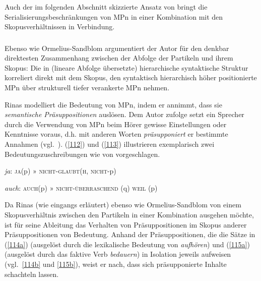 \noindent
Auch der im folgenden Abschnitt skizzierte Ansatz von \citet{Rinas2006, Rinas2007} bringt die Seria\-lisierungsbeschränkungen von MPn in einer Kombination mit den Skopusverhältnissen in Verbindung.

\subsubsection{\citet{Rinas2007}}
\label{sec:ri}
Ebenso wie Ormelius-Sandblom argumentiert der Autor für den denkbar direktesten Zusammenhang zwischen der Abfolge der Partikeln und ihrem Skopus: Die in (lineare Abfolge übersetzte) hierarchische syntaktische Struktur korreliert direkt mit dem Skopus, den syntaktisch hierarchisch höher positionierte MPn über strukturell tiefer verankerte MPn nehmen.

Rinas modelliert die Bedeutung von MPn, indem er annimmt, dass sie \textit{semanti\-sche Präsuppositionen} auslösen. Dem Autor zufolge setzt ein Sprecher durch die Verwendung von MPn beim Hörer gewisse Einstellungen oder Kenntnisse voraus, d.h. mit anderen Worten \textit{präsupponiert} er bestimmte Annahmen (vgl.\ \citealt[421--422]{Rinas2007}). (\ref{112}) und (\ref{113}) illustrieren exemplarisch zwei Bedeutungszuschreibungen wie von \citet[420 bzw. 425]{Rinas2007} vorgeschlagen.  

\begin{exe}
	\ex\label{112} 
			\textit{ja}: \textsc{ja}(p) » \textsc{nicht-glaubt}(\textsc{h}, \textsc{nicht}-p)	
\end{exe}
\begin{exe}
	\ex\label{113} 
			\textit{auch}: \textsc{auch}(p) » \textsc{nicht-überraschend} (q) \textsc{weil} (p)	
\end{exe}
Da Rinas (wie eingangs erläutert) ebenso wie Ormelius-Sandblom von einem Skopusverhältnis  zwischen den Partikeln in einer Kombination ausgehen möchte, ist für seine Ableitung das Verhalten von Präsuppositionen im Skopus anderer Präsuppositionen von Bedeutung. Anhand der Präsuppositionen, die die Sätze in (\ref{114a}) (ausgelöst durch die lexikalische Bedeutung von \textit{aufhören}) und (\ref{115a}) (ausgelöst durch das faktive Verb \textit{bedauern}) in Isolation jeweils aufweisen (vgl.\ \ref{114b} und \ref{115b}), weist er nach, dass sich präsupponierte Inhalte schachteln lassen.\pagebreak 

